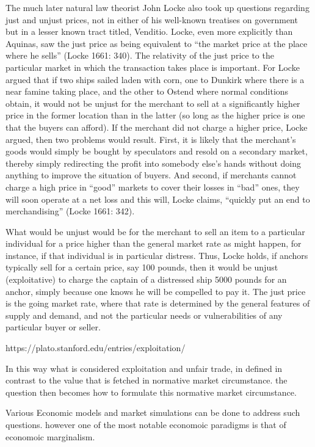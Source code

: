 \begin{displayquote}
The much later natural law theorist John Locke also took up questions regarding just and unjust prices, not in either of his well-known treatises on government but in a lesser known tract titled, Venditio. Locke, even more explicitly than Aquinas, saw the just price as being equivalent to “the market price at the place where he sells” (Locke 1661: 340). The relativity of the just price to the particular market in which the transaction takes place is important. For Locke argued that if two ships sailed laden with corn, one to Dunkirk where there is a near famine taking place, and the other to Ostend where normal conditions obtain, it would not be unjust for the merchant to sell at a significantly higher price in the former location than in the latter (so long as the higher price is one that the buyers can afford). If the merchant did not charge a higher price, Locke argued, then two problems would result. First, it is likely that the merchant’s goods would simply be bought by speculators and resold on a secondary market, thereby simply redirecting the profit into somebody else’s hands without doing anything to improve the situation of buyers. And second, if merchants cannot charge a high price in “good” markets to cover their losses in “bad” ones, they will soon operate at a net loss and this will, Locke claims, “quickly put an end to merchandising” (Locke 1661: 342).

What would be unjust would be for the merchant to sell an item to a particular individual for a price higher than the general market rate as might happen, for instance, if that individual is in particular distress. Thus, Locke holds, if anchors typically sell for a certain price, say 100 pounds, then it would be unjust (exploitative) to charge the captain of a distressed ship 5000 pounds for an anchor, simply because one knows he will be compelled to pay it. The just price is the going market rate, where that rate is determined by the general features of supply and demand, and not the particular needs or vulnerabilities of any particular buyer or seller.

https://plato.stanford.edu/entries/exploitation/
\end{displayquote}

In this way what is considered exploitation and unfair trade, in defined in contrast to the value that is fetched in normative market circumstance.
the question then becomes how to formulate this normative market circumstance.

Various Economic models and market simulations can be done to address such questions.
however one of the most notable economoic paradigms is that of economoic marginalism.

